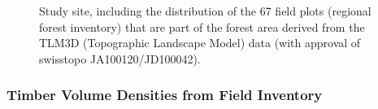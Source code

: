 \begin{figure}[H]
	\centering
	\caption{Study site, including the distribution of the 67 field plots (regional forest inventory) that are part of the forest area derived from the TLM3D (Topographic Landscape Model) data (with approval of swisstopo JA100120/JD100042).}
	\label{fig:StudyArea}
\end{figure}


\subsubsection{Timber Volume Densities from Field Inventory}
\label{sec:tvolvar}

